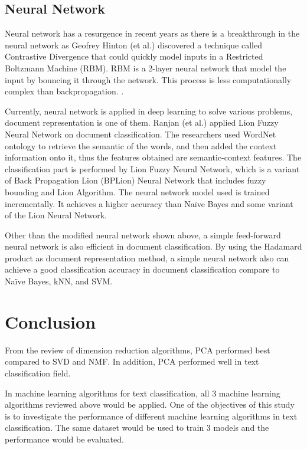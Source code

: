\subsection{Neural Network}
Neural network has a resurgence in recent years as there is a breakthrough in the neural network as Geofrey Hinton (et al.) discovered a technique called Contrastive Divergence that could quickly model inputs in a Restricted Boltzmann Machine (RBM). RBM is a 2-layer neural network that model the input by bouncing it through the network. This process is less computationally complex than backpropagation. \cite{nnHinton}.
	
Currently, neural network is applied in deep learning to solve various problems, document representation is one of them. Ranjan (et al.) applied Lion Fuzzy Neural Network on document 
classification. The researchers used WordNet ontology to retrieve the semantic of the words, 
and then added the context information onto it, thus the features obtained are semantic-context features. The classification part is performed by Lion Fuzzy Neural Network, which is a variant of Back Propagation Lion (BPLion) Neural Network that includes fuzzy bounding and Lion Algorithm. The neural network model used is trained incrementally. It achieves a higher accuracy than Naïve Bayes and some variant of the Lion Neural Network. \cite{lionNn}
	
Other than the modified neural network shown above, a simple feed-forward neural network is also efficient in document classification. By using the Hadamard product as document representation method, a simple neural network also can achieve a good classification accuracy in document classification compare to Naïve Bayes, kNN, and SVM. \cite{oneNn}
	
\section{Conclusion}
From the review of dimension reduction algorithms, PCA performed best compared to SVD and NMF. In addition, PCA performed well in text classification field. 
	
In machine learning algorithms for text classification, all 3 machine learning algorithms reviewed above would be applied. One of the objectives of this study is to investigate the performance of different machine learning algorithms in text classification. The same dataset would be used to train 3 models and the performance would be evaluated.
